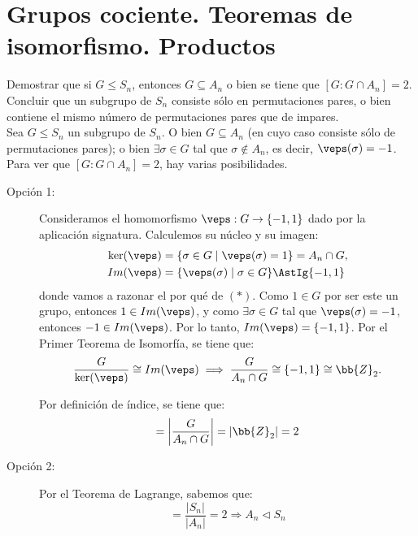 \section{Grupos cociente. Teoremas de isomorfismo. Productos}

\begin{ejercicio}
    Demostrar que si $G\leq S_n$, entonces $G\subseteq A_n$ o bien se tiene que $[G:G\cap A_n]=2$. Concluir que un subgrupo de $S_n$ consiste sólo en permutaciones pares, o bien contiene el mismo número de permutaciones pares que de impares.\\

    Sea $G\leq S_n$ un subgrupo de $S_n$. O bien $G\subseteq A_n$ (en cuyo caso consiste sólo de permutaciones pares); o bien $\exists \sigma\in G$ tal que $\sigma\notin A_n$, es decir, $\veps(\sigma)=-1$.
    Para ver que $[G:G\cap A_n]=2$, hay varias posibilidades.
    \begin{description}
        \item[Opción 1:] Consideramos el homomorfismo $\veps:G\to \{-1,1\}$ dado por la aplicación signatura. Calculemos su núcleo y su imagen:
        \begin{align*}
            \ker(\veps) &= \{\sigma\in G\mid \veps(\sigma)=1\} = A_n\cap G,\\
            Im(\veps) &= \{\veps(\sigma)\mid \sigma\in G\}\AstIg \{-1,1\}
        \end{align*}
        donde vamos a razonar el por qué de $(\ast)$.
        Como $1\in G$ por ser este un grupo, entonces $1\in Im(\veps)$, y como $\exists \sigma\in G$ tal que $\veps(\sigma)=-1$, entonces $-1\in Im(\veps)$. Por lo tanto, $Im(\veps)=\{-1,1\}$. Por el Primer Teorema de Isomorfía, se tiene que:
        \begin{equation*}
            \frac{G}{\ker(\veps)}\cong Im(\veps) \implies \frac{G}{A_n\cap G}\cong \{-1,1\}\cong \bb{Z}_2.
        \end{equation*}

        Por definición de índice, se tiene que:
        \begin{equation*}
            [G:A_n\cap G] = \left|\dfrac{G}{A_n\cap G}\right| = |\bb{Z}_2| = 2
        \end{equation*}

        \item[Opción 2:] Por el Teorema de Lagrange, sabemos que:
        \begin{equation*}
            [S_n : A_n] = \dfrac{|S_n|}{|A_n|} = 2\Longrightarrow A_n \lhd S_n
        \end{equation*}


\end{description}
\end{ejercicio}
